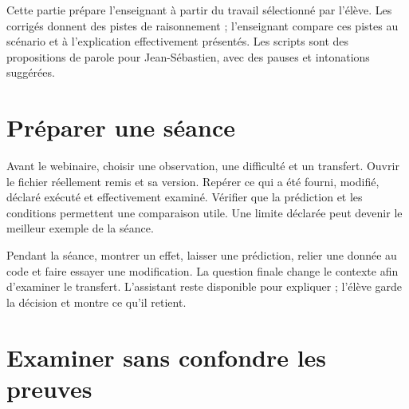 \documentclass[
  canadien,
  11pt,
  a4paper,
]{report}
\begin{document}
Cette partie prépare l'enseignant à partir du travail sélectionné par
l'élève. Les corrigés donnent des pistes de raisonnement ; l'enseignant
compare ces pistes au scénario et à l'explication effectivement
présentés. Les scripts sont des propositions de parole pour
Jean-Sébastien, avec des pauses et intonations suggérées.

\section{Préparer une séance}\label{pruxe9parer-une-suxe9ance}

Avant le webinaire, choisir une observation, une difficulté et un
transfert. Ouvrir le fichier réellement remis et sa version. Repérer ce
qui a été fourni, modifié, déclaré exécuté et effectivement examiné.
Vérifier que la prédiction et les conditions permettent une comparaison
utile. Une limite déclarée peut devenir le meilleur exemple de la
séance.

Pendant la séance, montrer un effet, laisser une prédiction, relier une
donnée au code et faire essayer une modification. La question finale
change le contexte afin d'examiner le transfert. L'assistant reste
disponible pour expliquer ; l'élève garde la décision et montre ce qu'il
retient.

\section{Examiner sans confondre les
preuves}\label{examiner-sans-confondre-les-preuves}
\end{document}
